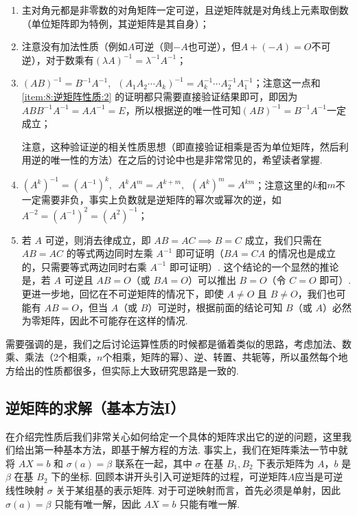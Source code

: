 \begin{enumerate}[label=(\arabic*)]
    \item 主对角元都是非零数的对角矩阵一定可逆，且逆矩阵就是对角线上元素取倒数（单位矩阵即为特例，其逆矩阵是其自身）；

    \item \label{item:8:逆矩阵性质:2}
          注意没有加法性质（例如$A$可逆（则$-A$也可逆），但$A+(-A)=O$不可逆），对于数乘有$(\lambda A)^{-1}=\lambda^{-1}A^{-1}$；

    \item \label{item:8:逆矩阵性质:3}
          $(AB)^{-1}=B^{-1}A^{-1},\enspace (A_1A_2\cdots A_k)^{-1}=A_k^{-1}\cdots A_2^{-1}A_1^{-1}$；注意这一点和 \ref*{item:8:逆矩阵性质:2} 的证明都只需要直接验证结果即可，即因为$ABB^{-1}A^{-1}=AA^{-1}=E$，所以根据逆的唯一性可知$(AB)^{-1}=B^{-1}A^{-1}$一定成立；

          注意，这种验证逆的相关性质思想（即直接验证相乘是否为单位矩阵，然后利用逆的唯一性的方法）在之后的讨论中也是非常常见的，希望读者掌握.

    \item $(A^k)^{-1}=(A^{-1})^k,\enspace A^kA^m=A^{k+m},\enspace (A^k)^m=A^{km}$；注意这里的$k$和$m$不一定需要非负，事实上负数就是逆矩阵的幂次或幂次的逆，如$A^{-2}=(A^{-1})^2=(A^2)^{-1}$；

    \item 若 $A$ 可逆，则消去律成立，即 $AB=AC \implies B=C$ 成立，我们只需在 $AB=AC$ 的等式两边同时左乘 $A^{-1}$ 即可证明（$BA = CA$ 的情况也是成立的，只需要等式两边同时右乘 $A^{-1}$ 即可证明）. 这个结论的一个显然的推论是，若 $A$ 可逆且 $AB=O$（或 $BA = O$）可以推出 $B=O$（令 $C = O$ 即可）. 更进一步地，回忆在不可逆矩阵的情况下，即使 $A\neq O$ 且 $B\neq O$，我们也可能有 $AB = O$，但当 $A$（或 $B$）可逆时，根据前面的结论可知 $B$（或 $A$）必然为零矩阵，因此不可能存在这样的情况.
\end{enumerate}

需要强调的是，我们之后讨论运算性质的时候都是循着类似的思路，考虑加法、数乘、乘法（2个相乘，$n$个相乘，矩阵的幂）、逆、转置、共轭等，所以虽然每个地方给出的性质都很多，但实际上大致研究思路是一致的.

\subsection{逆矩阵的求解（基本方法I）}

在介绍完性质后我们非常关心如何给定一个具体的矩阵求出它的逆的问题，这里我们给出第一种基本方法，即基于解方程的方法. 事实上，我们在矩阵乘法一节中就将 $AX = b$ 和 $\sigma(a) = \beta$ 联系在一起，其中 $\sigma$ 在基 $B_1, B_2$ 下表示矩阵为 $A$，$b$ 是 $\beta$ 在基 $B_2$ 下的坐标. 回顾本讲开头引入可逆矩阵的过程，可逆矩阵$A$应当是可逆线性映射 $\sigma$ 关于某组基的表示矩阵. 对于可逆映射而言，首先必须是单射，因此 $\sigma(a) = \beta$ 只能有唯一解，因此 $AX = b$ 只能有唯一解.

